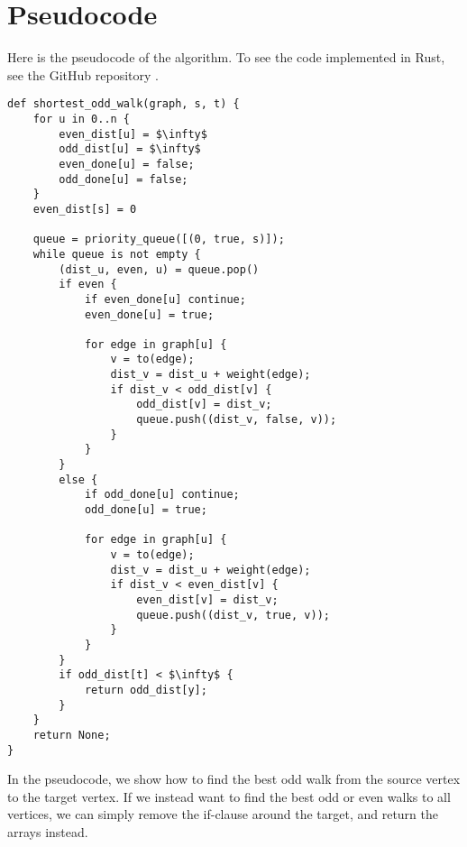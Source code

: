 \section{Pseudocode}
Here is the pseudocode of the algorithm. To see the code implemented in Rust, see the GitHub repository \cite{source:codebase}.

\begin{lstlisting}[caption={Shortest Odd Walk},label=Listing,mathescape=true]
def shortest_odd_walk(graph, s, t) {
    for u in 0..n {
        even_dist[u] = $\infty$
        odd_dist[u] = $\infty$
        even_done[u] = false;
        odd_done[u] = false;
    }
    even_dist[s] = 0

    queue = priority_queue([(0, true, s)]);
    while queue is not empty {
        (dist_u, even, u) = queue.pop()
        if even {
            if even_done[u] continue;
            even_done[u] = true;

            for edge in graph[u] {
                v = to(edge);
                dist_v = dist_u + weight(edge);
                if dist_v < odd_dist[v] {
                    odd_dist[v] = dist_v;
                    queue.push((dist_v, false, v));
                }
            }
        }
        else {
            if odd_done[u] continue;
            odd_done[u] = true;

            for edge in graph[u] {
                v = to(edge);
                dist_v = dist_u + weight(edge);
                if dist_v < even_dist[v] {
                    even_dist[v] = dist_v;
                    queue.push((dist_v, true, v));
                }
            }
        }
        if odd_dist[t] < $\infty$ {
            return odd_dist[y];
        }
    }
    return None;
}
\end{lstlisting}

In the pseudocode, we show how to find the best odd walk from the source vertex to the target vertex. If we instead want to find the best odd or even walks to all vertices, we can simply remove the if-clause around the target, and return the arrays instead.